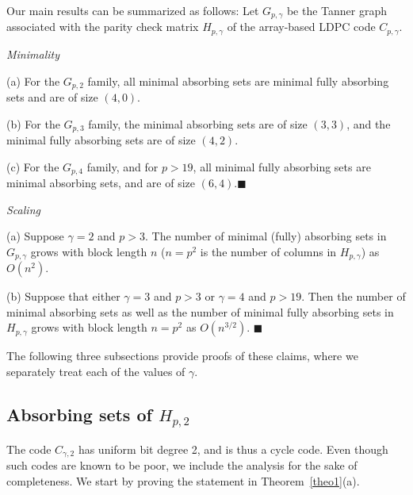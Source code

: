 Our main results can be summarized as follows: Let $G_{p,\gamma}$
be the Tanner graph associated with the parity check matrix
$H_{p,\gamma}$ of the array-based LDPC code $C_{p,\gamma}$.
\begin{theorem}\label{theo1}\emph{Minimality}

(a) For the $G_{p,2}$ family, all minimal absorbing sets are
minimal fully absorbing sets and are of size $(4,0)$.

(b) For the $G_{p,3}$ family, the minimal absorbing sets are of
size $(3,3)$, and the minimal fully absorbing sets are of size
$(4,2)$.

(c) For the $G_{p,4}$ family, and for $p>19$, all minimal fully
absorbing sets are minimal absorbing sets, and are of size
$(6,4)$.\hfill$\blacksquare$
\end{theorem}
\begin{theorem}\label{theo2}\emph{Scaling}

(a) Suppose $\gamma=2$ and $p>3$. The number of minimal (fully)
absorbing sets in $G_{p,\gamma}$ grows with block length $n$
($n=p^2$ is the number of columns in $H_{p,\gamma}$) as
$O(n^{2})$.

(b) Suppose that either $\gamma =3$ and $p
>3$ or $\gamma=4$ and $p > 19$. Then the number of minimal absorbing sets as well
as the number of minimal fully absorbing sets in $H_{p,\gamma}$
grows with block length $n=p^2$ as $O(n^{3/2})$.
\hfill$\blacksquare$
\end{theorem}

The following three subsections provide proofs of these claims,
where we separately treat each of the values of $\gamma$.

\subsection{Absorbing sets of
$H_{p,2}$}\label{theo12}

The code $C_{\gamma,2}$ has uniform bit degree 2, and is thus a
cycle code. Even though such codes are known to be poor, we
include the analysis for the sake of completeness.
We start by proving the statement in Theorem~\ref{theo1}(a).


